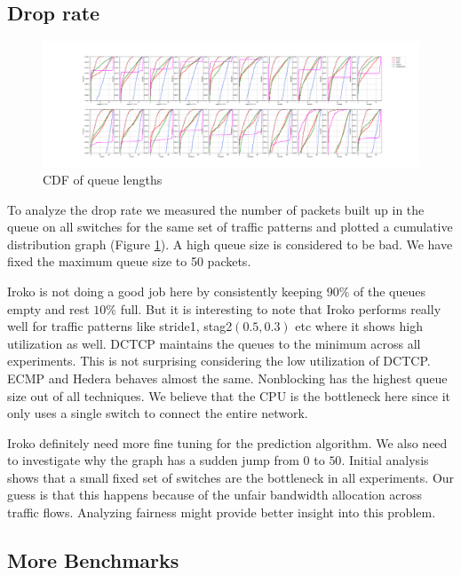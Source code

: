 \subsection{Drop rate}

\begin{figure}
	\centering
	\includegraphics[width=1\linewidth]{qlen.png}
	\caption{CDF of queue lengths}
	\label{fig:qlen}
\end{figure}

To analyze the drop rate we measured the number of packets built up in the queue
on all switches for the same set of traffic patterns and plotted a cumulative
distribution graph (Figure \ref{fig:qlen}). A high queue size is considered to
be bad. We have fixed the maximum queue size to 50 packets.

Iroko is not doing a good job here by consistently keeping $90\%$ of the queues
empty and rest $10\%$ full. But it is interesting to note that Iroko performs
really well for traffic patterns like stride1, stag2$(0.5,0.3)$ etc where it
shows high utilization as well. DCTCP maintains the queues to the minimum across
all experiments. This is not surprising considering the low utilization of
DCTCP. ECMP and Hedera behaves almost the same. Nonblocking has the highest
queue size out of all techniques. We believe that the CPU is the bottleneck here
since it only uses a single switch to connect the entire network.

Iroko definitely need more fine tuning for the prediction algorithm. We also
need to investigate why the graph has a sudden jump from $0$ to $50$. Initial
analysis shows that a small fixed set of switches are the bottleneck in all
experiments. Our guess is that this happens because of the unfair bandwidth
allocation across traffic flows. Analyzing fairness might provide better insight
into this problem.

\subsection{More Benchmarks}

